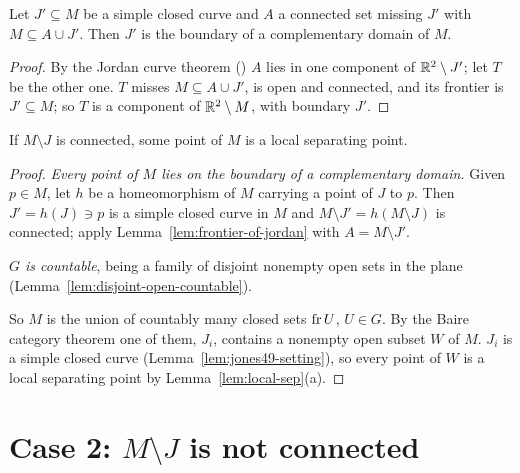 \begin{lemma}\label{lem:frontier-of-jordan}
Let $J'\subseteq M$ be a simple closed curve and $A$ a connected set missing $J'$ with $M\subseteq A\cup J'$. Then $J'$ is the boundary of a complementary domain of $M$.
\end{lemma}

\begin{proof}
By the Jordan curve theorem () $A$ lies in one component of $\mathbb{R}^2\setminus J'$; let $T$ be the other one. $T$ misses $M\subseteq A\cup J'$, is open and connected, and
its frontier is $J'\subseteq M$; so $T$ is a component of $\mathbb{R}^2\setminus M$, with boundary $J'$.
\end{proof}


\begin{proposition}[Case 1]\label{prop:case1}
If $M\setminus J$ is connected, some point of $M$ is a local separating point.
\end{proposition}

\begin{proof}
\emph{Every point of $M$ lies on the boundary of a complementary domain.} Given $p\in M$, let $h$ be a homeomorphism of $M$ carrying a point of $J$ to $p$. Then $J'=h(J)\ni p$ is a simple
closed curve in $M$ and $M\setminus J'=h(M\setminus J)$ is connected; apply Lemma~\ref{lem:frontier-of-jordan} with $A=M\setminus J'$.

\emph{$G$ is countable}, being a family of disjoint nonempty open sets in the plane (Lemma~\ref{lem:disjoint-open-countable}).

So $M$ is the union of countably many closed sets $\operatorname{fr} U$, $U\in G$. By the Baire category theorem one of them, $J_i$, contains a nonempty open subset $W$ of $M$. $J_i$ is a simple closed curve
(Lemma~\ref{lem:jones49-setting}), so every point of $W$ is a local separating point by Lemma~\ref{lem:local-sep}(a).
\end{proof}


\section{Case 2: \texorpdfstring{$M\setminus J$}{M - J} is not connected}

